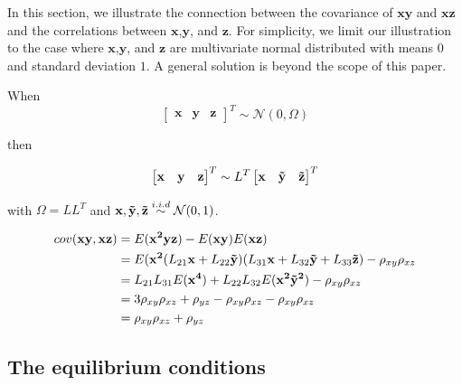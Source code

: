\documentclass[12pt]{article}
\begin{document}
In this section, we illustrate the connection between the covariance of
$\mathbf{xy}$ and $\mathbf{xz}$ and the correlations between $\mathbf{x}$,$\mathbf{y}$, and $\mathbf{z}$. For simplicity, we limit our illustration to the case where $\mathbf{x}$,$\mathbf{y}$, and $\mathbf{z}$ are multivariate normal distributed with means $0$ and standard deviation $1$. A general solution is beyond the scope of this paper. 

When 
\begin{equation*}
    \begin{bmatrix}
    \mathbf{x} & \mathbf{y} & \mathbf{z}
    \end{bmatrix}^T
    \sim 
    \mathcal{N}(0, \Omega)
\end{equation*}

then

\begin{equation*}
    \begin{bmatrix}
    \mathbf{x} & \mathbf{y} & \mathbf{z}
    \end{bmatrix}^T
    \sim
    L^T
    \begin{bmatrix}
    \mathbf{x} & \mathbf{\Tilde{y}} & \mathbf{\Tilde{z}}
    \end{bmatrix}^T
\end{equation*}

with $\Omega = LL^T$ and $\mathbf{x}, \mathbf{\Tilde{y}}, \mathbf{\Tilde{z}} \stackrel{i.i.d}{\sim} \mathcal{N}(0, 1)$. 

\begin{align*}
    cov(\mathbf{xy}, \mathbf{xz}) 
    &= E(\mathbf{x^2 y z}) - E(\mathbf{xy}) E(\mathbf{xz}) \\
    &= E(\mathbf{x^2} (L_{21} \mathbf{x} + L_{22} \mathbf{\Tilde{y}}) 
        (L_{31} \mathbf{x} + L_{32} \mathbf{\Tilde{y}} 
        + L_{33} \mathbf{\Tilde{z}})
        - \rho_{xy} \rho_{xz} \\
    &= L_{21} L_{31} E(\mathbf{x^4}) + L_{22} L_{32} E(\mathbf{x^2 \Tilde{y}^2})
        - \rho_{xy} \rho_{xz} \\
    &= 3 \rho_{xy} \rho_{xz} + \rho_{yz} - \rho_{xy} \rho_{xz}
        - \rho_{xy} \rho_{xz} \\
    &= \rho_{xy} \rho_{xz} + \rho_{yz}
\end{align*}


\subsection{The equilibrium
conditions}\label{the-equilibrium-conditions}
\end{document}
